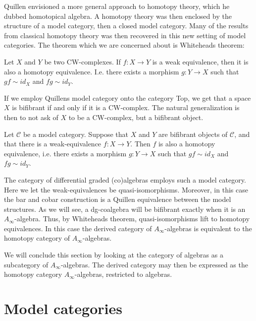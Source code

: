 \documentclass[../thesis.tex]{subfiles}
\begin{document}
        Quillen envisioned a more general approach to homotopy theory, which he dubbed homotopical algebra. A homotopy theory was then enclosed by the structure of a model category, then a closed model category. Many of the results from classical homotopy theory was then recovered in this new setting of model categories. The theorem which we are concerned about is Whiteheads theorem:

        \begin{thm}
            Let $X$ and $Y$ be two CW-complexes. If $f:X\rightarrow Y$ is a weak equivalence, then it is also a homotopy equivalence. I.e. there exists a morphism $g: Y\rightarrow X$ such that $gf\sim id_X$ and $fg\sim id_Y$.
        \end{thm}

        If we employ Quillens model category onto the category Top, we get that a space $X$ is bifibrant if and only if it is a CW-complex. The natural generalization is then to not ask of $X$ to be a CW-complex, but a bifibrant object.

        \begin{thm}
            Let $\mathcal{C}$ be a model category. Suppose that $X$ and $Y$ are bifibrant objects of $\mathcal{C}$, and that there is a weak-equivalence $f:X\rightarrow Y$. Then $f$ is also a homotopy equivalence, i.e. there exists a morphism $g: Y\rightarrow X$ such that $gf\sim id_X$ and $fg\sim id_Y$.
        \end{thm}

        The category of differential graded (co)algebras employs such a model category. Here we let the weak-equivalences be quasi-isomorphisms. Moreover, in this case the bar and cobar construction is a Quillen equivalence between the model structures. As we will see, a dg-coalgebra will be bifibrant exactly when it is an $A_\infty$-algebra. Thus, by Whiteheads theorem, quasi-isomorphisms lift to homotopy equivalences. In this case the derived category of $A_\infty$-algebras is equivalent to the homotopy category of $A_\infty$-algebras.

        We will conclude this section by looking at the category of algebras as a subcategory of $A_\infty$-algebras. The derived category may then be expressed as the homotopy category $A_\infty$-algebras, restricted to algebras.

    \section{Model categories}
\end{document}
